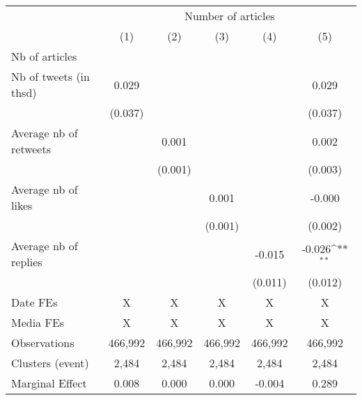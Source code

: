 {
\def\sym#1{\ifmmode^{#1}\else\(^{#1}\)\fi}
\begin{tabular}{l*{5}{c}}
\hline\hline
                    &\multicolumn{5}{c}{Number of articles}                                                                       \\\cmidrule(lr){2-6}
                    &\multicolumn{1}{c}{(1)}         &\multicolumn{1}{c}{(2)}         &\multicolumn{1}{c}{(3)}         &\multicolumn{1}{c}{(4)}         &\multicolumn{1}{c}{(5)}         \\
\hline
Nb of articles      &                     &                     &                     &                     &                     \\
Nb of tweets (in thsd)&       0.029         &                     &                     &                     &       0.029         \\
                    &     (0.037)         &                     &                     &                     &     (0.037)         \\
Average nb of retweets&                     &       0.001         &                     &                     &       0.002         \\
                    &                     &     (0.001)         &                     &                     &     (0.003)         \\
Average nb of likes &                     &                     &       0.001         &                     &      -0.000         \\
                    &                     &                     &     (0.001)         &                     &     (0.002)         \\
Average nb of replies&                     &                     &                     &      -0.015         &      -0.026\sym{**} \\
                    &                     &                     &                     &     (0.011)         &     (0.012)         \\
\hline
Date FEs            &           X         &           X         &           X         &           X         &           X         \\
Media FEs           &           X         &           X         &           X         &           X         &           X         \\
Observations        &     466,992         &     466,992         &     466,992         &     466,992         &     466,992         \\
Clusters (event)    &       2,484         &       2,484         &       2,484         &       2,484         &       2,484         \\
Marginal Effect     &       0.008         &       0.000         &       0.000         &      -0.004         &       0.289         \\
\hline\hline
\end{tabular}
}
